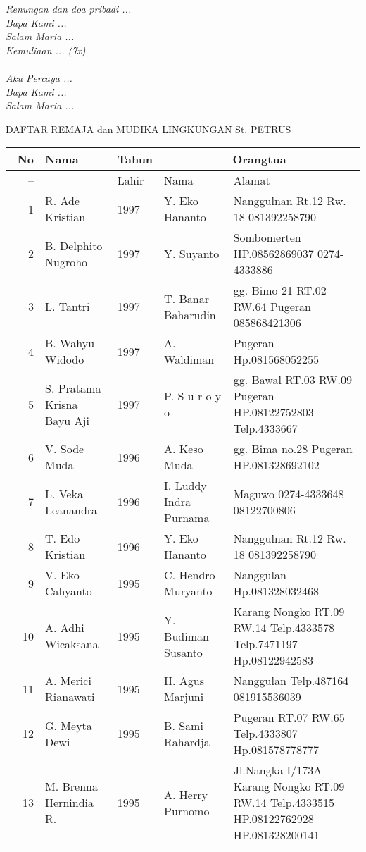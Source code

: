 \documentclass[a5paper,titlepage,11pt]{book}
\begin{document}
{\it Renungan dan doa pribadi ...\\
Bapa Kami ...\\
Salam Maria ...\\
Kemuliaan ... (7x)\\ \\
Aku Percaya ...\\
Bapa Kami ...\\
Salam Maria ...}    %
\newpage
\begin{center}
DAFTAR REMAJA dan MUDIKA LINGKUNGAN St. PETRUS
\end{center}
\scriptsize
\begin{tabular}{|r|p{2.75cm}|p{0.75cm}|p{2.75cm}|p{3cm}|}
\hline
\hline
{No}	&{Nama} &Tahun&\multicolumn{2}{|c|}{Orangtua}\\  \hline{~~~--}
                     &                      &Lahir&Nama	&Alamat\\ \hline
1&R. Ade Kristian&1997&Y. Eko Hananto&Nanggulnan Rt.12 Rw. 18 081392258790\\
2&B. Delphito Nugroho&1997&Y. Suyanto&Sombomerten HP.08562869037 0274-4333886\\
3&L. Tantri&1997&T. Banar Baharudin&gg. Bimo 21 RT.02 RW.64 Pugeran 085868421306\\
4&B. Wahyu Widodo&1997&A. Waldiman&Pugeran Hp.081568052255\\
5&S. Pratama Krisna Bayu Aji&1997&P. S u r o y o&gg. Bawal  RT.03 RW.09 Pugeran HP.08122752803 Telp.4333667\\
6&V. Sode Muda&1996&A. Keso Muda&gg. Bima no.28 Pugeran HP.081328692102\\
7&L. Veka Leanandra&1996&I. Luddy Indra Purnama&Maguwo 0274-4333648 08122700806\\
8&T. Edo Kristian&1996&Y. Eko Hananto&Nanggulnan Rt.12 Rw. 18 081392258790\\
9&V. Eko Cahyanto&1995&C. Hendro Muryanto&Nanggulan Hp.081328032468\\
10&A. Adhi Wicaksana&1995&Y. Budiman Susanto&Karang Nongko  RT.09 RW.14 Telp.4333578 Telp.7471197 Hp.08122942583\\
11&A. Merici Rianawati&1995&H. Agus Marjuni&Nanggulan Telp.487164 081915536039\\
12&G. Meyta Dewi&1995&B. Sami Rahardja&Pugeran RT.07 RW.65 Telp.4333807 Hp.081578778777\\
13&M. Brenna Hernindia R.&1995&A. Herry Purnomo&Jl.Nangka I/173A Karang Nongko RT.09 RW.14 Telp.4333515 HP.08122762928 HP.081328200141\\

\end{tabular}
\end{document}
